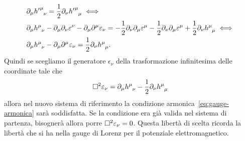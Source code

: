 \begin{equation}
  \begin{split}
    &\partial_{\mu} \tensor{{h'}}{^{\mu}_{\nu}} = \frac{1}{2}\partial_{\nu}
    \tensor{{h'}}{^{\mu}_{\mu}} \iff \\
    &\partial_{\mu} \tensor{h}{^{\mu}_{\nu}}
    - \partial_{\mu} \partial_{\nu} \epsilon^{\nu}
    - \partial_{\mu}\partial^{\mu} \epsilon_{\nu}
    = -\frac{1}{2} \partial_{\nu} \partial_{\mu} \epsilon^{\mu} -
    \frac{1}{2}\partial_{\nu} \partial_{\mu} \epsilon^{\mu} +
    \frac{1}{2} \partial_{\nu} \tensor{h}{^{\mu}_{\mu}} \iff \\
    &\partial_{\mu} \tensor{h}{^{\mu}_{\nu}}
    - \partial_{\mu}\partial^{\mu} \epsilon_{\nu}
    = \frac{1}{2} \partial_{\nu} \tensor{h}{^{\mu}_{\mu}}.
  \end{split}
\end{equation}
Quindi se scegliamo il generatore $\epsilon_{\nu}$ della trasformazione
infinitesima delle coordinate tale che
\begin{equation}
  \dalamb \epsilon_{\nu} = \partial_{\mu} \tensor{h}{^{\mu}_{\nu}} -
  \frac{1}{2} \partial_{\nu} \tensor{h}{^{\mu}_{\mu}}
\end{equation}
allora nel nuovo sistema di riferimento la condizione
armonica~\eqref{eq:gauge-armonica} sarà soddisfatta.  Se la condizione era già
valida nel sistema di partenza, bisognerà allora porre
$\Box^{2} \varepsilon_{\nu} = 0$.  Questa libertà di scelta ricorda la libertà che
si ha nella gauge di Lorenz per il potenziale elettromagnetico.

